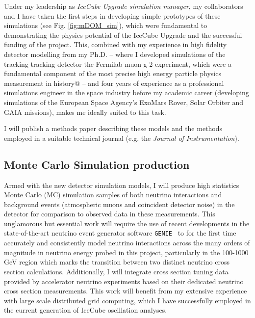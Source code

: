 \documentclass[a4paper,11pt]{article}
\begin{document}
Under my leadership as \textit{IceCube Upgrade simulation manager}, my collaborators and I have taken the first steps in developing simple prototypes of these simulations (see Fig. \ref{fig:mDOM_sim}), which were fundamental to demonstrating the physics potential of the IceCube Upgrade and the successful funding of the project. This, combined with my experience in high fidelity detector modelling from my Ph.D. -- where I developed simulations of the tracking tracking detector the Fermilab muon g-2 experiment, which were a fundamental component of the most precise high energy particle physics measurement in history@\cite{gm2_run1_result} -- and four years of experience as a professional simulations engineer in the space industry before my academic career (developing simulations of the European Space Agency's ExoMars Rover, Solar Orbiter and GAIA missions), makes me ideally suited to this task. 

I will publish a methods paper describing these models and the methods employed in a suitable technical journal (e.g. the \textit{Journal of Instrumentation}). \\


\subsection{Monte Carlo Simulation production}

Armed with the new detector simulation models, I will produce high statistics Monte Carlo (MC) simulation samples of both neutrino interactions and background events (atmospheric muons and coincident detector noise) in the detector for comparison to observed data in these measurements. This unglamorous but essential work will require the use of recent developments in the state-of-the-art neutrino event generator software \texttt{GENIE}~ to for the first time accurately and consistently model neutrino interactions across the many orders of magnitude in neutrino energy probed in this project, particularly in the 100-1000 GeV region which marks the transition between two distinct neutrino cross section calculations. Additionally, I will integrate cross section tuning data provided by accelerator neutrino experiments based on their dedicated neutrino cross section measurements. This work will benefit from my extensive experience with large scale distributed grid computing, which I have successfully employed in the current generation of IceCube oscillation analyses.
\end{document}
